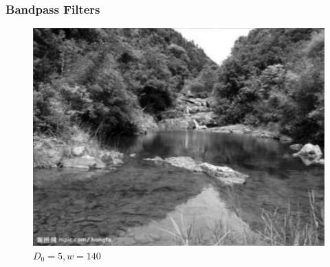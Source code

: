 \documentclass[notheorems, serif, table, compress]{beamer}  %
\begin{document}
\begin{frame}
\frametitle{Bandpass Filters}%
\begin{figure}
 \centering
 \caption{$D_{0}=5,w=140$}%
 \includegraphics[width=0.8\linewidth]{d05w140bandpass.png} 
 \end{figure}
\end{frame}

\end{document}
